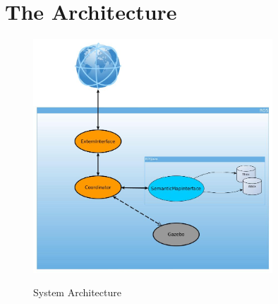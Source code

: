 \section{The Architecture}


\begin{figure}[H]
\centering
\includegraphics[width=0.8\textwidth]{imgs/architecture.jpg}
\label{fig:actions}
\caption{System Architecture}
\end{figure}
